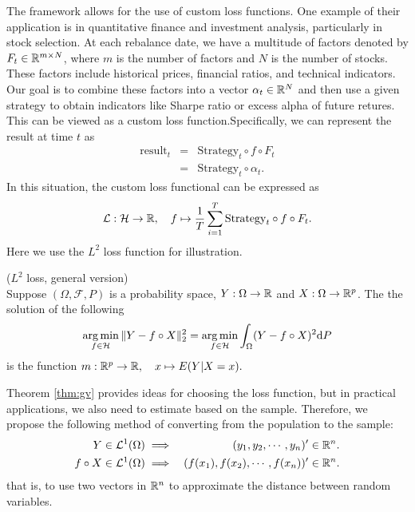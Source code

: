 The framework allows for the use of custom loss functions. One example of their application is in quantitative finance and investment analysis, particularly in stock selection. At each rebalance date, we have a multitude of factors denoted by $F_t \in \mathbb{R}^{m \times N}$, where $m$ is the number of factors and $N$ is the number of stocks. These factors include historical prices, financial ratios, and technical indicators. Our goal is to combine these factors into a vector $\alpha_t \in \mathbb{R}^N$ and then use a given strategy to obtain indicators like Sharpe ratio or excess alpha of future retures. This  can be viewed as a custom loss function.Specifically, we can represent the result at time $t$ as 
\begin{eqnarray*}
\mathrm{result}_t &=& \mathrm{Strategy}_t \circ f \circ F_t \\
 &=&\mathrm{Strategy}_t \circ \alpha_t.
\end{eqnarray*}
In this situation, the custom loss functional can be expressed as 
$$
\mathcal{L}: \mathcal{H} \to \mathbb{R}, \quad f \mapsto \frac{1}{T}\sum_{i=1}^T \mathrm{Strategy}_t \circ f \circ F_t.
$$
Here we use the $L^2$ loss function for illustration.

\begin{Theorem}{($L^2$ loss, general version)}\label{thm:gv} \ \\
Suppose $(\Omega, \mathcal{F}, P)$ is a probability space, $Y: \Omega \to \mathbb{R}$ and $X: \Omega \to \mathbb{R}^p$. The the solution of the following
$$
\mathop{\arg\min}_{f \in \mathcal{H}} \Vert Y - f \circ X\Vert_2 ^2 =\mathop{\arg\min}_{f \in \mathcal{H}} \int_{\Omega} (Y-f \circ X)^2 \mathrm{d} P
$$
is the function $m: \mathbb{R}^p \to \mathbb{R}, \quad x \mapsto E(Y|X=x).$
\end{Theorem}
Theorem \ref{thm:gv} provides ideas for choosing the loss function, but in practical applications, we also need to estimate based on the sample. Therefore, we propose the following method of converting from the population to the sample:
\begin{eqnarray*}
Y \in \mathcal{L}^1(\Omega) &\implies& (y_1,y_2,\cdots,y_n)^\prime \in \mathbb{R}^n. \\
f\circ X \in \mathcal{L}^1(\Omega) & \implies & (f(x_1), f(x_2), \cdots, f(x_n))^\prime \in \mathbb{R}^n.
\end{eqnarray*}
 that is, to use two vectors in $\mathbb{R}^n$ to approximate the distance between random variables.


